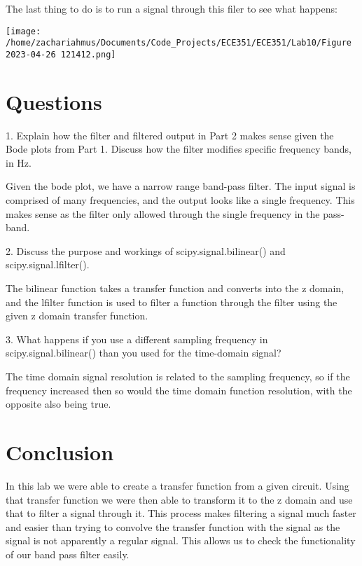 \documentclass[12pt,a4paper]{article}
\begin{document}
The last thing to do is to run a signal through this filer to see what happens: \vspace*{12pt}

\texttt{[image: /home/zachariahmus/Documents/Code\_Projects/ECE351/ECE351/Lab10/Figure 2023-04-26 121412.png]} \vspace*{12pt}

\section*{Questions}
1. Explain how the filter and filtered output in Part 2 makes sense given the Bode plots from
Part 1. Discuss how the filter modifies specific frequency bands, in Hz. \vspace*{12pt}

Given the bode plot, we have a narrow range band-pass filter. The input signal is comprised of many frequencies, and the output looks like a single frequency. This makes sense as the filter only allowed through the single frequency in the pass-band. 


2. Discuss the purpose and workings of
scipy.signal.bilinear() and scipy.signal.lfilter().\vspace*{12pt}

The bilinear function takes a transfer function and converts into the z domain, and the lfilter function is used to filter a function through the filter using the given z domain transfer function. 

3. What happens if you use a different sampling frequency in scipy.signal.bilinear() than
you used for the time-domain signal? \vspace*{12pt}

The time domain signal resolution is related to the sampling frequency, so if the frequency increased then so would the time domain function resolution, with the opposite also being true. 

\section*{Conclusion}
In this lab we were able to create a transfer function from a given circuit. Using that transfer function we were then able to transform it to the z domain and use that to filter a signal through it. This process makes filtering a signal much faster and easier than trying to convolve the transfer function with the signal as the signal is not apparently a regular signal. This allows us to check the functionality of our band pass filter easily. 
\end{document}
